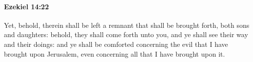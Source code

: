 
		\paragraph{Ezekiel 14:22} %
			\label{EZEKIEL-14-22}

			Yet, behold, therein shall be left a remnant that shall be brought forth, both sons and daughters: behold, they shall come forth unto you, and ye shall see their way and their doings: and ye shall be comforted concerning the evil that I have brought upon Jerusalem, even concerning all that I have brought upon it.


